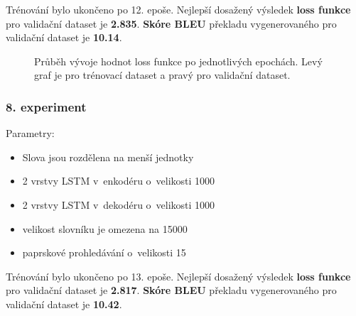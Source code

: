 Trénování bylo ukončeno po 12. epoše. Nejlepší dosažený výsledek \textbf{loss funkce} pro validační dataset je \textbf{2.835}. \textbf{Skóre BLEU} překladu vygenerovaného pro validační dataset je \textbf{10.14}.

\begin{figure}[H]
    \begin{center}
    \end{center}
	\caption{Průběh vývoje hodnot loss funkce po jednotlivých epochách. Levý graf je pro trénovací dataset a pravý pro validační dataset.}
\end{figure}


\subsubsection{8. experiment}\label{experiment8}
Parametry:
\begin{itemize}
  \item Slova jsou rozdělena na menší jednotky
  \item 2 vrstvy LSTM v~enkodéru o~velikosti 1000
  \item 2 vrstvy LSTM v~dekodéru o~velikosti 1000
  \item velikost slovníku je omezena na 15000
  \item paprskové prohledávání o~velikosti 15
\end{itemize}

Trénování bylo ukončeno po 13. epoše. Nejlepší dosažený výsledek \textbf{loss funkce} pro validační dataset je \textbf{2.817}. \textbf{Skóre BLEU} překladu vygenerovaného pro validační dataset je \textbf{10.42}.

